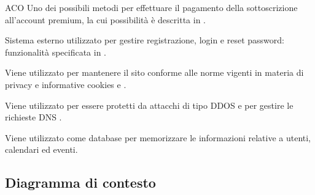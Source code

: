 \begin{listaPersonale}{ACO}
    Uno dei possibili metodi per effettuare il pagamento della sottoscrizione all'account premium, la cui possibilità è descritta in .

    Sistema esterno utilizzato  per gestire registrazione, login e reset password: funzionalità specificata in .

    Viene utilizzato per mantenere il sito conforme alle norme vigenti in materia di privacy e informative cookies  e .

    Viene utilizzato per essere protetti da attacchi di tipo DDOS e per gestire le richieste DNS .

    Viene utilizzato come database per memorizzare le informazioni relative a utenti, calendari ed eventi.
    \begin{comment}
    \elemento[Sistema di posta elettronica:]{aco:PostaElettronica}
    Viene utilizzato per mandare l'email di recupero della password all'utente standard, come specificato in \prettyref{D1-rf:RecuperoPassword}.
    \end{comment}
\end{listaPersonale}


\subsection{Diagramma di contesto}
\label{secD2:DiagrammaContesto}


